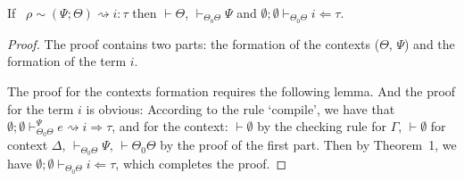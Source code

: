 \documentclass{sig-alternate}
\begin{document}
\begin{theorem}[Compilation]
If ~$\rho\sim(\Psi;\Theta)\rightsquigarrow i:\tau$ then $\vdash\Theta$, $\vdash_{\Theta_0\Theta}\Psi$ and $\emptyset;\emptyset\vdash_{\Theta_0\Theta} i\Leftarrow\tau$.
\end{theorem}
\begin{proof}
The proof contains two parts: the formation of the contexts ($\Theta$, $\Psi$) and the formation of the term $i$.

The proof for the contexts formation requires the following lemma. And the proof for the term $i$ is obvious: According to the rule `compile', we have that $\emptyset;\emptyset\vdash_{\Theta_0\Theta}^{\Psi}e\rightsquigarrow i\Rightarrow \tau$, and for the context: $\vdash\emptyset$ by the checking rule for $\Gamma$, $\vdash\emptyset$ for context $\Delta$, $\vdash_{\Theta_0\Theta}\Psi$, $\vdash\Theta_0\Theta$ by the proof of the first part. Then by Theorem~1, we have $\emptyset;\emptyset\vdash_{\Theta_0\Theta}i\Leftarrow\tau$, which completes the proof.
\end{proof}
\end{document}
